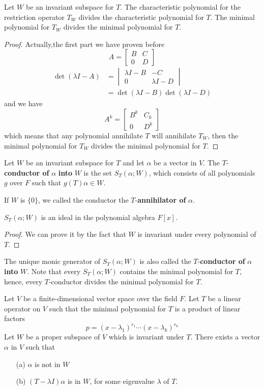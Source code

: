 \documentclass{article}
\begin{document}
\begin{lem}
	Let $W$ be an invariant subspace for $T$. The characteristic polynomial for the restriction operator $T_W$ divides the characteristic polynomial for $T$. The minimal polynomial for $T_W$ divides the minimal polynomial for $T$.
\end{lem}
\begin{proof}
	Actually,the first part we have proven before
	\[A=\begin{bmatrix}
		B&C\\
		0&D
	\end{bmatrix}\]
	\begin{align*}
		\det(\lambda I-A)&=\begin{vmatrix}
			\lambda I-B&-C\\
			0&\lambda I-D
		\end{vmatrix}\\
		&=\det(\lambda I-B)\det(\lambda I-D)
	\end{align*}
	and we have
	\[A^k=\begin{bmatrix}
		B^k&C_k\\
		0&D^k
	\end{bmatrix}\]
	which means that any polynomial annihilate $T$ will annihilate $T_W$, then the minimal polynomial for $T_W$ divides the minimal polynomial for $T$. 
\end{proof}
\begin{dde}
	Let $W$ be an invariant subspace for $T$ and let $\alpha$ be a vector in $V$. The $T$-\textbf{conductor of} $\alpha$ \textbf{into} $W$ is the set $S_T(\alpha;W)$, which consists of all polynomials $g$ over $F$ such that $g(T)\alpha\in W$.
\end{dde}
If $W$ is $\{0\}$, we called the conductor the $T$-\textbf{annihilator of} $\alpha$.
\begin{lem}
	$S_T(\alpha;W)$ is an ideal in the polynomial algebra $F[x]$.
\end{lem}
\begin{proof}
	We can prove it by the fact that $W$ is invariant under every polynomial of $T$.  
\end{proof}
The unique monic generator of $S_T(\alpha;W)$ is also called the $T$-\textbf{conductor of} $\alpha$ \textbf{into} $W$. Note that every $S_T(\alpha;W)$ contains the minimal polynomial for $T$, hence, every $T$-conductor divides the minimal polynomial for $T$.
\begin{lem}
	Let $V$ be a finite-dimensional vector space over the field $F$. Let $T$ be a linear operator on $V$ such that the minimal polynomial for $T$ is a product of linear factors
	\[p=(x-\lambda_1)^{r_1}\cdots(x-\lambda_k)^{r_k}\]
	Let $W$ be a proper subspace of $V$ which is invariant under $T$. There exists a vector $\alpha$ in $V$ such that
	\begin{enumerate}
		\item [(a)]$\alpha$ is not in $W$
		\item [(b)]$(T-\lambda I)\alpha$ is in $W$, for some eigenvalue $\lambda$ of $T$.
	\end{enumerate}
\end{lem}
\end{document}
